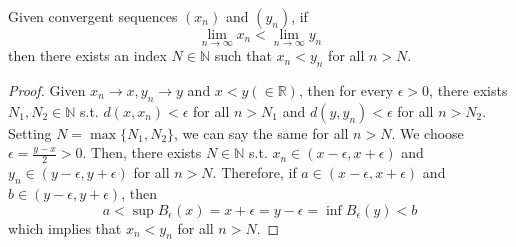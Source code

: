   \begin{theorem}
    \label{thm:preservation-of-ordering-between-sequences-and}
    Given convergent sequences $(x_n)$ and $(y_n)$, if 
    \begin{equation}
      \lim_{n \rightarrow \infty} x_n < \lim_{n \rightarrow \infty} y_n
    \end{equation}
    then there exists an index $N \in \mathbb{N}$ such that $x_n < y_n$ for all $n > N$. 
  \end{theorem}
  \begin{proof}
    Given $x_n \rightarrow x, y_n \rightarrow y$ and $x < y (\in \mathbb{R})$, then for every $\epsilon > 0$, there exists $N_1, N_2 \in \mathbb{N}$ s.t. $d(x, x_n) < \epsilon$ for all $n > N_1$ and $d(y, y_n) < \epsilon$ for all $n > N_2$. Setting $N = \max\{N_1, N_2\}$, we can say the same for all $n > N$. We choose $\epsilon = \frac{y - x}{2} > 0$. Then, there exists $N \in \mathbb{N}$ s.t. $x_n \in (x - \epsilon, x + \epsilon)$ and $y_n \in (y - \epsilon, y + \epsilon)$ for all $n > N$. Therefore, if $a \in (x - \epsilon, x + \epsilon)$ and $b \in (y - \epsilon, y + \epsilon)$, then 
    \begin{equation}
      a < \sup B_\epsilon (x) = x + \epsilon = y - \epsilon = \inf B_\epsilon (y) < b
    \end{equation}
    which implies that $x_n < y_n$ for all $n > N$. 
  \end{proof}

